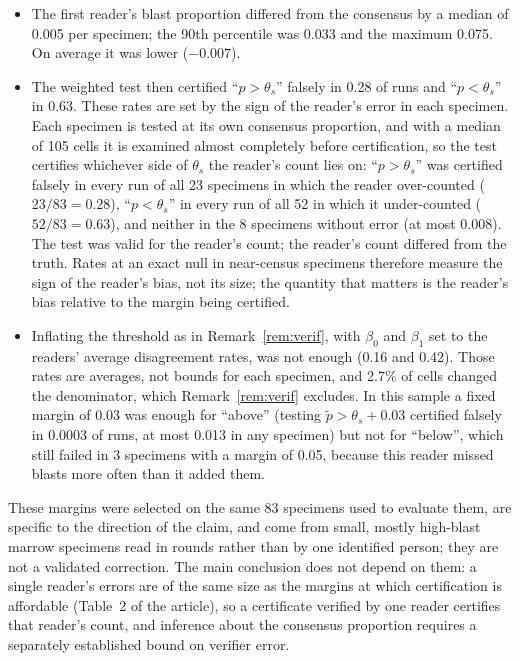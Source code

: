 \documentclass[11pt]{article}
\theoremstyle{remark}
\theoremstyle{definition}
\begin{document}
\begin{itemize}
\item The first reader's blast proportion differed from the consensus by a median of 0.005 per specimen; the 90th percentile was 0.033 and the maximum 0.075. On average it was lower ($-0.007$).
\item The weighted test then certified ``$p>\theta_s$'' falsely in 0.28 of runs and ``$p<\theta_s$'' in 0.63. These rates are set by the sign of the reader's error in each specimen. Each specimen is tested at its own consensus proportion, and with a median of 105 cells it is examined almost completely before certification, so the test certifies whichever side of $\theta_s$ the reader's count lies on: ``$p>\theta_s$'' was certified falsely in every run of all 23 specimens in which the reader over-counted ($23/83=0.28$), ``$p<\theta_s$'' in every run of all 52 in which it under-counted ($52/83=0.63$), and neither in the 8 specimens without error (at most 0.008). The test was valid for the reader's count; the reader's count differed from the truth. Rates at an exact null in near-census specimens therefore measure the sign of the reader's bias, not its size; the quantity that matters is the reader's bias relative to the margin being certified.
\item Inflating the threshold as in Remark~\ref{rem:verif}, with $\beta_0$ and $\beta_1$ set to the readers' average disagreement rates, was not enough (0.16 and 0.42). Those rates are averages, not bounds for each specimen, and 2.7\% of cells changed the denominator, which Remark~\ref{rem:verif} excludes. In this sample a fixed margin of 0.03 was enough for ``above'' (testing $\tilde p>\theta_s+0.03$ certified falsely in 0.0003 of runs, at most 0.013 in any specimen) but not for ``below'', which still failed in 3 specimens with a margin of 0.05, because this reader missed blasts more often than it added them.
\end{itemize}
These margins were selected on the same 83 specimens used to evaluate them, are specific to the direction of the claim, and come from small, mostly high-blast marrow specimens read in rounds rather than by one identified person; they are not a validated correction. The main conclusion does not depend on them: a single reader's errors are of the same size as the margins at which certification is affordable (Table~2 of the article), so a certificate verified by one reader certifies that reader's count, and inference about the consensus proportion requires a separately established bound on verifier error.
\end{document}
